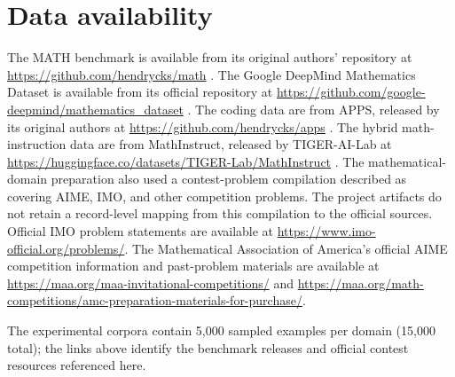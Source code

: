 \documentclass[preprint,12pt]{elsarticle}
\begin{document}
\section*{Data availability}
The MATH benchmark is available from its original authors' repository at
\url{https://github.com/hendrycks/math} \cite{hendrycksmath2021}. The Google
DeepMind Mathematics Dataset is available from its official repository at
\url{https://github.com/google-deepmind/mathematics_dataset}
\cite{saxton2019math}. The coding data are from APPS, released by its original
authors at \url{https://github.com/hendrycks/apps}
\cite{hendrycksapps2021}. The hybrid math-instruction data are from MathInstruct,
released by TIGER-AI-Lab at
\url{https://huggingface.co/datasets/TIGER-Lab/MathInstruct}
\cite{yue2024mammoth}. The mathematical-domain preparation also used a
contest-problem compilation described as covering AIME, IMO, and other
competition problems. The project artifacts do not retain a record-level
mapping from this compilation to the official sources. Official IMO problem
statements are available at
\url{https://www.imo-official.org/problems/}. The Mathematical Association of
America's official AIME competition information and past-problem materials are
available at \url{https://maa.org/maa-invitational-competitions/} and
\url{https://maa.org/math-competitions/amc-preparation-materials-for-purchase/}.

The experimental corpora contain 5,000 sampled examples per domain (15,000
total); the links above identify the benchmark releases and official contest
resources referenced here.
\end{document}
